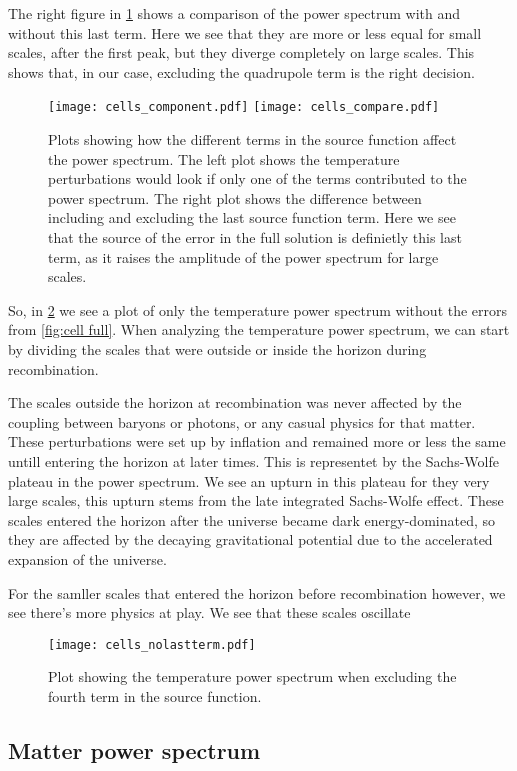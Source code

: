 \documentclass[12pt]{article}
\begin{document}
The right figure in \cref{fig:cell debugging} shows a comparison of the power spectrum with and without this last term. Here we see that they are more or less equal for small scales, after the first peak, but they diverge completely on large scales. This shows that, in our case, excluding the quadrupole term is the right decision. 



\begin{figure}[h]
    \centering
    \texttt{[image: cells\_component.pdf]}
    \texttt{[image: cells\_compare.pdf]}  
    \caption{Plots showing how the different terms in the source function affect the power spectrum. The left plot shows the temperature perturbations would look if only one of the terms contributed to the power spectrum. The right plot shows the difference between including and excluding the last source function term. Here we see that the source of the error in the full solution is definietly this last term, as it raises the amplitude of the power spectrum for large scales.}
    \label{fig:cell debugging}
\end{figure}

So, in \cref{fig:cell no last term} we see a plot of only the temperature power spectrum without the errors from \cref{fig:cell full}. When analyzing the temperature power spectrum, we can start by dividing the scales that were outside or inside the horizon during recombination. 

The scales outside the horizon at recombination was never affected by the coupling between baryons or photons, or any casual physics for that matter. These perturbations were set up by inflation and remained more or less the same untill entering the horizon at later times. This is representet by the Sachs-Wolfe plateau in the power spectrum. We see an upturn in this plateau for they very large scales, this upturn stems from the late integrated Sachs-Wolfe effect. These scales entered the horizon after the universe became dark energy-dominated, so they are affected by the decaying gravitational potential due to the accelerated expansion of the universe.

For the samller scales that entered the horizon before recombination however, we see there's more physics at play. We see that these scales oscillate 



\begin{figure}[h]
    \centering
    \texttt{[image: cells\_nolastterm.pdf]} 
    \caption{Plot showing the temperature power spectrum when excluding the fourth term in the source function.}
    \label{fig:cell no last term}
\end{figure}

\subsection{Matter power spectrum}

{}

\end{document}
